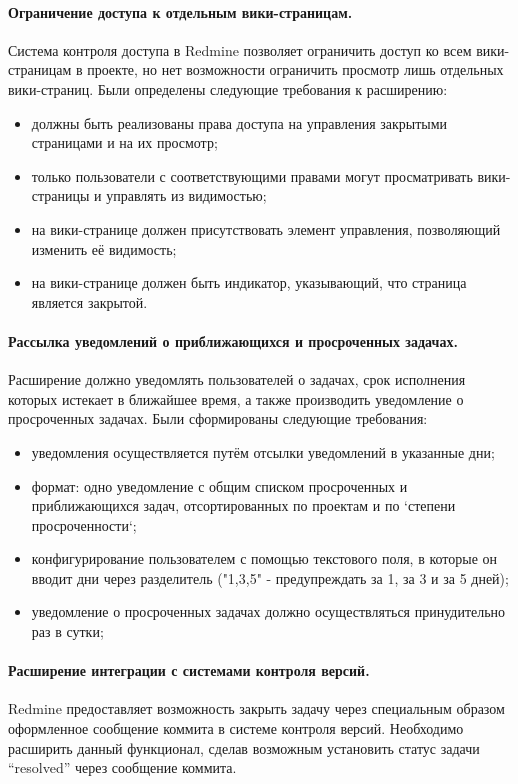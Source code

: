 \paragraph{Ограничение доступа к отдельным вики-страницам.}
\label{definition:private_wiki}
Система контроля доступа в Redmine позволяет ограничить доступ ко всем
вики-страницам в проекте, но нет возможности ограничить просмотр лишь отдельных
вики-страниц. Были определены следующие требования к расширению:
\begin{itemize}
  \item должны быть реализованы права доступа на управления закрытыми
  страницами и на их просмотр;
  \item только пользователи с соответствующими правами могут просматривать
  вики-страницы и управлять из видимостью;   
  \item на вики-странице должен присутствовать элемент управления, позволяющий
  изменить её видимость;
  \item на вики-странице должен быть индикатор, указывающий, что страница
  является закрытой.
\end{itemize}

\paragraph{Рассылка уведомлений о приближающихся и просроченных задачах.}
\label{definition:due_date_reminder}
Расширение должно уведомлять пользователей о задачах, срок исполнения которых
истекает в ближайшее время, а также производить уведомление о просроченных
задачах. Были сформированы следующие требования:
\begin{itemize}
  \item уведомления осуществляется путём отсылки уведомлений в указанные дни;
  \item формат: одно уведомление с общим списком просроченных и приближающихся
  задач, отсортированных по проектам и по `степени просроченности`; 
  \item конфигурирование пользователем с помощью текстового поля, в которые он
  вводит дни через разделитель ("1,3,5" - предупреждать за 1, за 3 и за 5
  дней);
  \item уведомление о просроченных задачах должно осуществляться принудительно
  раз в сутки;
\end{itemize}

\paragraph{Расширение интеграции с системами контроля версий.}
Redmine предоставляет возможность закрыть задачу через специальным образом
оформленное сообщение коммита в системе контроля версий. Необходимо расширить
данный функционал, сделав возможным установить статус задачи ``resolved''
через сообщение коммита.

